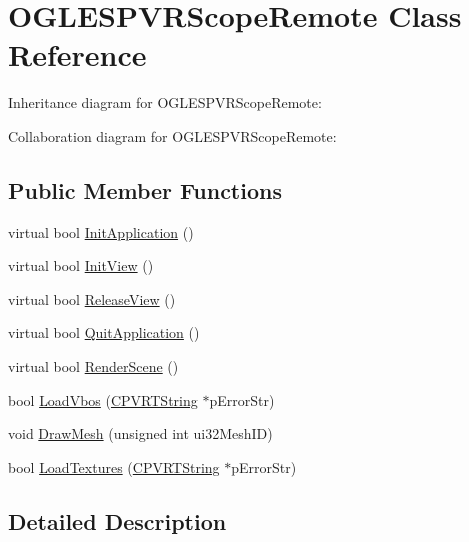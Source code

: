 \hypertarget{class_o_g_l_e_s_p_v_r_scope_remote}{\section{O\+G\+L\+E\+S\+P\+V\+R\+Scope\+Remote Class Reference}
\label{class_o_g_l_e_s_p_v_r_scope_remote}
}


Inheritance diagram for O\+G\+L\+E\+S\+P\+V\+R\+Scope\+Remote\+:


Collaboration diagram for O\+G\+L\+E\+S\+P\+V\+R\+Scope\+Remote\+:
\subsection*{Public Member Functions}
\begin{DoxyCompactItemize}
\item 
virtual bool \hyperlink{class_o_g_l_e_s_p_v_r_scope_remote_a96be64b54dbade6adafcf1472fcc5ca8}{Init\+Application} ()
\item 
virtual bool \hyperlink{class_o_g_l_e_s_p_v_r_scope_remote_ab84a7b569b59b319c4deaaac33faa080}{Init\+View} ()
\item 
virtual bool \hyperlink{class_o_g_l_e_s_p_v_r_scope_remote_aa6b01e36e428eecefd5aa1b451ebf307}{Release\+View} ()
\item 
virtual bool \hyperlink{class_o_g_l_e_s_p_v_r_scope_remote_a13f0c7f112787dcf970b6cb92dff5d55}{Quit\+Application} ()
\item 
virtual bool \hyperlink{class_o_g_l_e_s_p_v_r_scope_remote_aa5045c43650a2d19542cc42bd1ecc75e}{Render\+Scene} ()
\item 
bool \hyperlink{class_o_g_l_e_s_p_v_r_scope_remote_a4a34ae5e9df07b29ea3587474b50fdf1}{Load\+Vbos} (\hyperlink{class_c_p_v_r_t_string}{C\+P\+V\+R\+T\+String} $\ast$p\+Error\+Str)
\item 
void \hyperlink{class_o_g_l_e_s_p_v_r_scope_remote_a24e076130489a4d9ecb5c299a9cd510a}{Draw\+Mesh} (unsigned int ui32\+Mesh\+I\+D)
\item 
bool \hyperlink{class_o_g_l_e_s_p_v_r_scope_remote_a0b01a92d5148c361266f8f61abbbe361}{Load\+Textures} (\hyperlink{class_c_p_v_r_t_string}{C\+P\+V\+R\+T\+String} $\ast$p\+Error\+Str)
\end{DoxyCompactItemize}


\subsection{Detailed Description}


